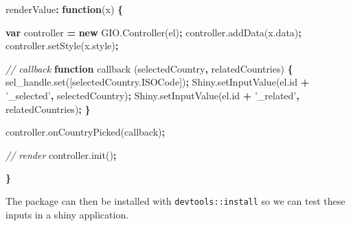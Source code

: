 \documentclass[10pt,]{krantz}
\makeatletter
\newenvironment{Shaded}{\begin{snugshade}}{\end{snugshade}}
\newcommand{\AttributeTok}[1]{\textcolor[rgb]{0.61,0.61,0.61}{#1}}
\newcommand{\CommentTok}[1]{\textcolor[rgb]{0.37,0.37,0.37}{\textit{#1}}}
\newcommand{\KeywordTok}[1]{\textcolor[rgb]{0.27,0.27,0.27}{\textbf{#1}}}
\newcommand{\NormalTok}[1]{#1}
\newcommand{\OperatorTok}[1]{\textcolor[rgb]{0.43,0.43,0.43}{\textbf{#1}}}
\newcommand{\StringTok}[1]{\textcolor[rgb]{0.5,0.5,0.5}{#1}}
\newcommand{\VariableTok}[1]{\textcolor[rgb]{0,0,0}{#1}}
\newenvironment{kframe}{%
\medskip{}
\setlength{\fboxsep}{.8em}
 \def\at@end@of@kframe{}%
 \ifinner\ifhmode%
  \def\at@end@of@kframe{\end{minipage}}%
  \begin{minipage}{\columnwidth}%
 \fi\fi%
 \def\FrameCommand##1{\hskip\@totalleftmargin \hskip-\fboxsep
 \colorbox{shadecolor}{##1}\hskip-\fboxsep
     \hskip-\linewidth \hskip-\@totalleftmargin \hskip\columnwidth}%
 \MakeFramed {\advance\hsize-\width
   \@totalleftmargin\z@ \linewidth\hsize
   \@setminipage}}%
 {\par\unskip\endMakeFramed%
 \at@end@of@kframe}
\renewenvironment{Shaded}{\begin{kframe}}{\end{kframe}}
\makeatother
\begin{document}
\begin{Shaded}
\begin{Highlighting}[]
\NormalTok{renderValue}\OperatorTok{:} \KeywordTok{function}\NormalTok{(x) }\OperatorTok{\{}

  \KeywordTok{var}\NormalTok{ controller }\OperatorTok{=} \KeywordTok{new} \VariableTok{GIO}\NormalTok{.}\AttributeTok{Controller}\NormalTok{(el)}\OperatorTok{;}
  \VariableTok{controller}\NormalTok{.}\AttributeTok{addData}\NormalTok{(}\VariableTok{x}\NormalTok{.}\AttributeTok{data}\NormalTok{)}\OperatorTok{;}
  \VariableTok{controller}\NormalTok{.}\AttributeTok{setStyle}\NormalTok{(}\VariableTok{x}\NormalTok{.}\AttributeTok{style}\NormalTok{)}\OperatorTok{;}

  \CommentTok{// callback}
  \KeywordTok{function} \AttributeTok{callback}\NormalTok{ (selectedCountry}\OperatorTok{,}\NormalTok{ relatedCountries) }\OperatorTok{\{}
    \VariableTok{sel_handle}\NormalTok{.}\AttributeTok{set}\NormalTok{([}\VariableTok{selectedCountry}\NormalTok{.}\AttributeTok{ISOCode}\NormalTok{])}\OperatorTok{;}
    \VariableTok{Shiny}\NormalTok{.}\AttributeTok{setInputValue}\NormalTok{(}\VariableTok{el}\NormalTok{.}\AttributeTok{id} \OperatorTok{+} \StringTok{'_selected'}\OperatorTok{,}\NormalTok{ selectedCountry)}\OperatorTok{;}
    \VariableTok{Shiny}\NormalTok{.}\AttributeTok{setInputValue}\NormalTok{(}\VariableTok{el}\NormalTok{.}\AttributeTok{id} \OperatorTok{+} \StringTok{'_related'}\OperatorTok{,}\NormalTok{ relatedCountries)}\OperatorTok{;}
  \OperatorTok{\}}

  \VariableTok{controller}\NormalTok{.}\AttributeTok{onCountryPicked}\NormalTok{(callback)}\OperatorTok{;}

  \CommentTok{// render}
  \VariableTok{controller}\NormalTok{.}\AttributeTok{init}\NormalTok{()}\OperatorTok{;}

\OperatorTok{\}}
\end{Highlighting}
\end{Shaded}

The package can then be installed with \texttt{devtools::install} so we can test these inputs in a shiny application.
\end{document}
